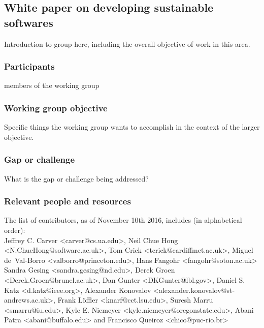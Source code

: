 \subsection{White paper on developing sustainable softwares}
\label{sec:best-practices-developing}


Introduction to group here, including the overall objective of work in this area.

\subsubsection{Participants}

members of the working group

\subsubsection{Working group objective}

Specific things the working group wants to accomplish in the context of the larger objective.

\subsubsection{Gap or challenge}

What is the gap or challenge being addressed?

\subsubsection{Relevant people and resources}

The list of contributors, as of November 10th 2016, includes (in alphabetical order): \\
Jeffrey C. Carver <carver@cs.ua.edu>, 
Neil Chue Hong <N.ChueHong@software.ac.uk>, 
Tom Crick <tcrick@cardiffmet.ac.uk>, 
Miguel de~Val-Borro <valborro@princeton.edu>, 
Hans Fangohr <fangohr@soton.ac.uk>
Sandra Gesing <sandra.gesing@nd.edu>, 
Derek Groen <Derek.Groen@brunel.ac.uk>, 
Dan Gunter <DKGunter@lbl.gov>,
Daniel S. Katz <d.katz@ieee.org>,
Alexander Konovalov <alexander.konovalov@st-andrews.ac.uk>,
Frank Löffler <knarf@cct.lsu.edu>,
Suresh Marru <smarru@iu.edu>,
Kyle E. Niemeyer <kyle.niemeyer@oregonstate.edu>,
Abani Patra <abani@buffalo.edu> 
and 
Francisco Queiroz <chico@puc-rio.br>

